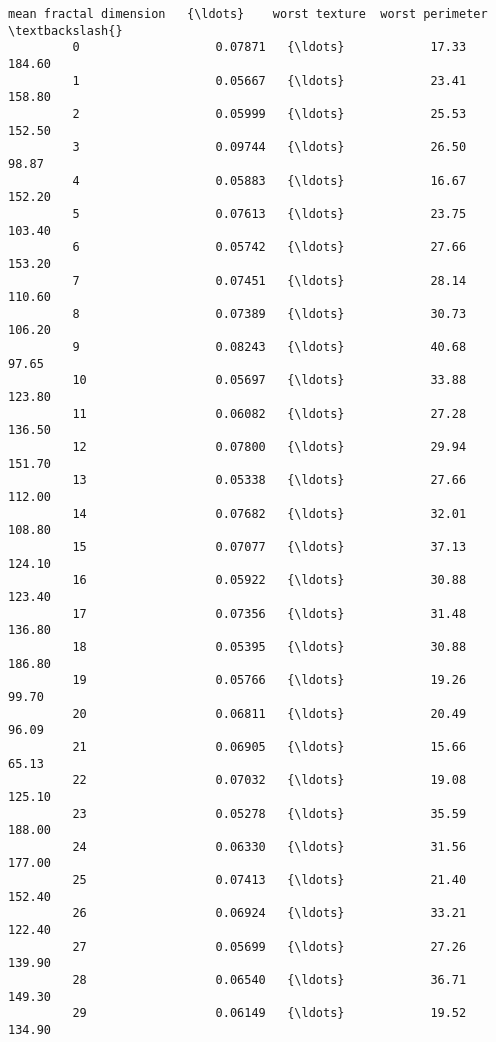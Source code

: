 \documentclass[11pt]{article}
\begin{document}
\begin{Verbatim}[commandchars=\\\{\}]
              mean fractal dimension   {\ldots}    worst texture  worst perimeter  \textbackslash{}
         0                   0.07871   {\ldots}            17.33           184.60   
         1                   0.05667   {\ldots}            23.41           158.80   
         2                   0.05999   {\ldots}            25.53           152.50   
         3                   0.09744   {\ldots}            26.50            98.87   
         4                   0.05883   {\ldots}            16.67           152.20   
         5                   0.07613   {\ldots}            23.75           103.40   
         6                   0.05742   {\ldots}            27.66           153.20   
         7                   0.07451   {\ldots}            28.14           110.60   
         8                   0.07389   {\ldots}            30.73           106.20   
         9                   0.08243   {\ldots}            40.68            97.65   
         10                  0.05697   {\ldots}            33.88           123.80   
         11                  0.06082   {\ldots}            27.28           136.50   
         12                  0.07800   {\ldots}            29.94           151.70   
         13                  0.05338   {\ldots}            27.66           112.00   
         14                  0.07682   {\ldots}            32.01           108.80   
         15                  0.07077   {\ldots}            37.13           124.10   
         16                  0.05922   {\ldots}            30.88           123.40   
         17                  0.07356   {\ldots}            31.48           136.80   
         18                  0.05395   {\ldots}            30.88           186.80   
         19                  0.05766   {\ldots}            19.26            99.70   
         20                  0.06811   {\ldots}            20.49            96.09   
         21                  0.06905   {\ldots}            15.66            65.13   
         22                  0.07032   {\ldots}            19.08           125.10   
         23                  0.05278   {\ldots}            35.59           188.00   
         24                  0.06330   {\ldots}            31.56           177.00   
         25                  0.07413   {\ldots}            21.40           152.40   
         26                  0.06924   {\ldots}            33.21           122.40   
         27                  0.05699   {\ldots}            27.26           139.90   
         28                  0.06540   {\ldots}            36.71           149.30   
         29                  0.06149   {\ldots}            19.52           134.90   

\end{Verbatim}
\end{document}
